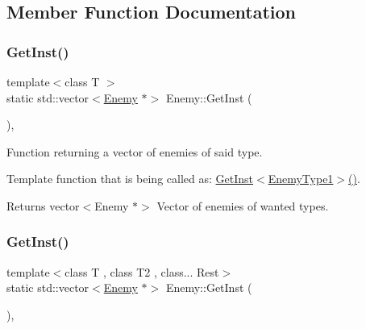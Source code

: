\subsection{Member Function Documentation}
\mbox{\label{class_enemy_a747d610b1a24386b9bd85c50132ffa98}} 
\subsubsection{\texorpdfstring{Get\+Inst()}{GetInst()}\hspace{0.1cm}{\footnotesize\ttfamily [1/2]}}
{\footnotesize\ttfamily template$<$class T $>$ \\
static std\+::vector$<$\hyperlink{class_enemy}{Enemy} $\ast$$>$ Enemy\+::\+Get\+Inst (\begin{DoxyParamCaption}{ }\end{DoxyParamCaption})\hspace{0.3cm}{\ttfamily [inline]}, {\ttfamily [static]}}



Function returning a vector of enemies of said type. 

Template function that is being called as\+: \hyperlink{class_enemy_a747d610b1a24386b9bd85c50132ffa98}{Get\+Inst$<$\+Enemy\+Type1$>$()}.

\begin{DoxyReturn}{Returns}
vector$<$\+Enemy $\ast$$>$ Vector of enemies of wanted types. 
\end{DoxyReturn}
\mbox{\label{class_enemy_a4c0528b6b7e94cfbceada5bd00f7193d}} 
\subsubsection{\texorpdfstring{Get\+Inst()}{GetInst()}\hspace{0.1cm}{\footnotesize\ttfamily [2/2]}}
{\footnotesize\ttfamily template$<$class T , class T2 , class... Rest$>$ \\
static std\+::vector$<$\hyperlink{class_enemy}{Enemy} $\ast$$>$ Enemy\+::\+Get\+Inst (\begin{DoxyParamCaption}{ }\end{DoxyParamCaption})\hspace{0.3cm}{\ttfamily [inline]}, {\ttfamily [static]}}



